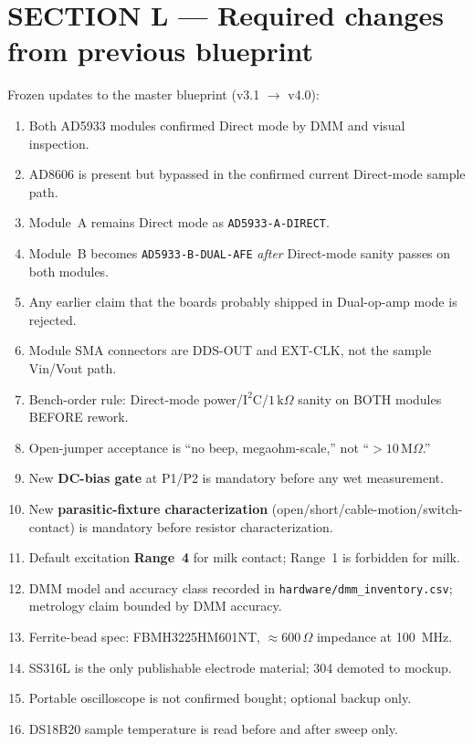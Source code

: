 \documentclass[11pt,a4paper]{article}
\newcommand{\kohm}[1]{\ensuremath{#1\,\mathrm{k}\Omega}}
\newcommand{\Mohm}[1]{\ensuremath{#1\,\mathrm{M}\Omega}}
\newcommand{\Rohm}[1]{\ensuremath{#1\,\Omega}}
\begin{document}
\section{SECTION L --- Required changes from previous blueprint}
\label{sec:L}

Frozen updates to the master blueprint (v3.1 $\rightarrow$ v4.0):

\begin{enumerate}
\item Both AD5933 modules confirmed Direct mode by DMM and visual inspection.
\item AD8606 is present but bypassed in the confirmed current Direct-mode sample path.
\item Module~A remains Direct mode as \texttt{AD5933-A-DIRECT}.
\item Module~B becomes \texttt{AD5933-B-DUAL-AFE} \emph{after} Direct-mode sanity passes on both modules.
\item Any earlier claim that the boards probably shipped in Dual-op-amp mode is rejected.
\item Module SMA connectors are DDS-OUT and EXT-CLK, not the sample Vin/Vout path.
\item Bench-order rule: Direct-mode power/$\mathrm{I^2C}$/\kohm{1} sanity on BOTH modules BEFORE rework.
\item Open-jumper acceptance is ``no beep, megaohm-scale,'' not ``$>\Mohm{10}$.''
\item New \textbf{DC-bias gate} at P1/P2 is mandatory before any wet measurement.
\item New \textbf{parasitic-fixture characterization} (open/short/cable-motion/switch-contact) is mandatory before resistor characterization.
\item Default excitation \textbf{Range~4} for milk contact; Range~1 is forbidden for milk.
\item DMM model and accuracy class recorded in \texttt{hardware/dmm\_inventory.csv}; metrology claim bounded by DMM accuracy.
\item Ferrite-bead spec: FBMH3225HM601NT, $\approx\Rohm{600}$ impedance at \SI{100}{\mega\hertz}.
\item SS316L is the only publishable electrode material; 304 demoted to mockup.
\item Portable oscilloscope is not confirmed bought; optional backup only.
\item DS18B20 sample temperature is read before and after sweep only.

\end{enumerate}
\end{document}
